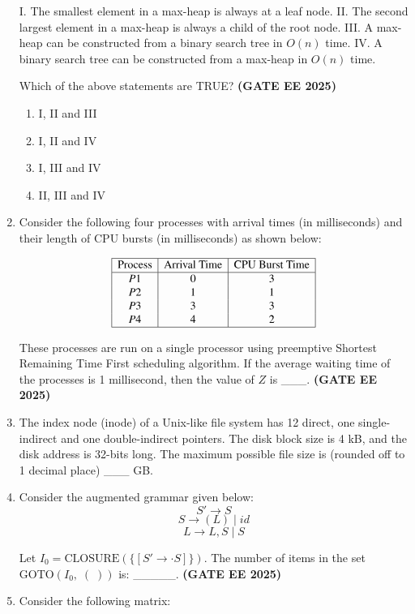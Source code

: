 \documentclass[journal,12pt,onecolumn]{IEEEtran}
\theoremstyle{remark}
\begin{document}
\begin{enumerate}
I. The smallest element in a max-heap is always at a leaf node.
II. The second largest element in a max-heap is always a child of the root node.
III. A max-heap can be constructed from a binary search tree in $O(n)$ time.
IV. A binary search tree can be constructed from a max-heap in $O(n)$ time.


Which of the above statements are TRUE? \hfill \textbf{(GATE EE 2025)}
\begin{enumerate}
\item  I, II and III
\item  I, II and IV
\item  I, III and IV
\item  II, III and IV
\end{enumerate}

\item Consider the following four processes with arrival times (in milliseconds) and their length of CPU bursts (in milliseconds) as shown below:


\[
\begin{array}{|c|c|c|}
\hline
\text{Process} & \text{Arrival Time} & \text{CPU Burst Time} \\
\hline
P1 & 0 & 3 \\
P2 & 1 & 1 \\
P3 & 3 & 3 \\
P4 & 4 & 2 \\
\hline
\end{array}
\]


These processes are run on a single processor using preemptive Shortest Remaining Time First scheduling algorithm. If the average waiting time of the processes is 1 millisecond, then the value of $Z$ is \_\_\_. \hfill \textbf{(GATE EE 2025)}

\item The index node (inode) of a Unix-like file system has 12 direct, one single-indirect and one double-indirect pointers. The disk block size is 4 kB, and the disk address is 32-bits long. The maximum possible file size is (rounded off to 1 decimal place) \_\_\_ GB.

\item Consider the augmented grammar given below:
\[
S' \to S
\]
\[
S \to (L) \mid id
\]
\[
L \to L, S \mid S
\]

Let $I_0 = \mathrm{CLOSURE}(\{[S' \to \cdot S]\})$.  
The number of items in the set $\mathrm{GOTO}(I_0, \; (\; ))$ is: \_\_\_\_\_.
\hfill \textbf{(GATE EE 2025)}


\item Consider the following matrix:


\end{enumerate}
\end{document}
